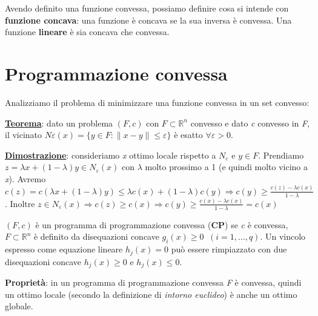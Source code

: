 \documentclass[11pt]{book}
\begin{document}
Avendo definito una funzione convessa, possiamo definire cosa si
intende con {\bf funzione concava}: una funzione \`e concava se la sua
inversa \`e convessa. Una funzione {\bf lineare} \`e sia concava che
convessa.


\section{Programmazione convessa}

Analizziamo il problema di minimizzare una funzione convessa in un set
convesso:

{\bf \underline{Teorema}}: dato un problema $(F,c)$ con $F \subset
\mathbb{R}^n$ convesso e dato {\em c} convesso in {\em F}, il vicinato
$N\varepsilon (x) = \{y\in F :\|x-y\|\leq \varepsilon\}$ \`e esatto
$\forall \varepsilon > 0$.

{\bf \underline{Dimostrazione}}: consideriamo {\em x} ottimo locale
rispetto a $N_{\varepsilon}$ e $y \in F$. Prendiamo $z = \lambda x +
(1-\lambda)y \in N_{\varepsilon}(x)$ con $\lambda$ molto prossimo a 1
(e quindi molto vicino a {\em x}). Avremo $c(z) = c(\lambda x +
(1-\lambda)y) \leq \lambda c(x) + (1-\lambda)c(y) \Rightarrow c(y)
\geq \frac{c(z)-\lambda c(x)}{1-\lambda}$. Inoltre $z \in
N_{\varepsilon}(x) \Rightarrow c(z) \geq c(x) \Rightarrow c(y) \geq
\frac{c(x)-\lambda c(x)}{1-\lambda} = c(x)$

\vspace{20pt}

$(F,c)$ \`e un programma di programmazione convessa ({\bf CP}) se {\em
  c} \`e convessa, $F \subset \mathbb{R}^n$ \`e definito da
disequazioni concave $g_i(x)\geq 0\phantom{a}(i=1,\dots,q)$. Un
vincolo espresso come equazione lineare $h_j(x)=0$ pu\`o essere
rimpiazzato con due disequazioni concave $h_j(x)\geq 0$ e $h_j(x)\leq
0$.

{\bf Propriet\`a}: in un programma di programmazione convessa {\em F}
\`e convessa, quindi un ottimo locale (secondo la definizione di
{\em intorno euclideo}) \`e anche un ottimo globale.
\end{document}
